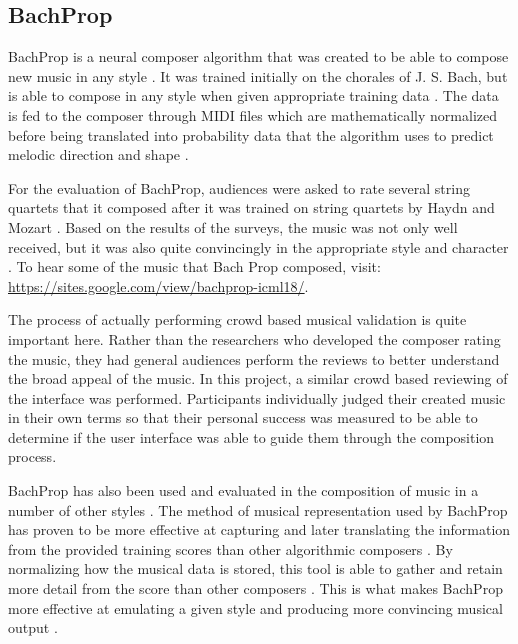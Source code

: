 \subsection{BachProp}
\label{subsec:bachprop}

BachProp is a neural composer algorithm that was created to be able to compose new music in any style \cite{Colombo_2018Com}.  It was trained initially on the chorales of J. S. Bach, but is able to compose in any style when given appropriate training data \cite{Colombo_2018Com}.  The data is fed to the composer through MIDI files which are mathematically normalized before being translated into probability data that the algorithm uses to predict melodic direction and shape \cite{Colombo_2018Com}.

\vspace{\baselineskip}

For the evaluation of BachProp, audiences were asked to rate several string quartets that it composed after it was trained on string quartets by Haydn and Mozart \cite{Colombo_2018Com}.  Based on the results of the surveys, the music was not only well received, but it was also quite convincingly in the appropriate style and character \cite{Colombo_2018Com}.  To hear some of the music that Bach Prop composed, visit: \url{https://sites.google.com/view/bachprop-icml18/}.

\vspace{\baselineskip}

The process of actually performing crowd based musical validation is quite important here.  Rather than the researchers who developed the composer rating the music, they had general audiences perform the reviews to better understand the broad appeal of the music.  In this project, a similar crowd based reviewing of the interface was performed.  Participants individually judged their created music in their own terms so that their personal success was measured to be able to determine if the user interface was able to guide them through the composition process.

\vspace{\baselineskip}

BachProp has also been used and evaluated in the composition of music in a number of other styles \cite{Colombo_2018Gen}.  The method of musical representation used by BachProp has proven to be more effective at capturing and later translating the information from the provided training scores than other algorithmic composers \cite{Colombo_2018Gen}.  By normalizing how the musical data is stored, this tool is able to gather and retain more detail from the score than other composers \cite{Colombo_2018Gen}.  This is what makes BachProp more effective at emulating a given style and producing more convincing musical output \cite{Colombo_2018Gen}.

